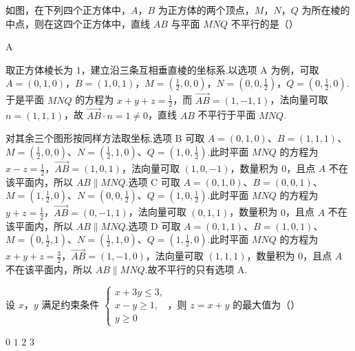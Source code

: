 \begin{problem}
如图，在下列四个正方体中，\(A\)，\(B\) 为正方体的两个顶点，\(M\)，\(N\)，\(Q\) 为所在棱的中点，则在这四个正方体中，直线 \(AB\) 与平面 \(MNQ\) 不平行的是（\quad）

    {}
    {}
    {}
\end{problem}

\begin{answer}
A
\end{answer}

\begin{solution}
取正方体棱长为 \(1\)，建立沿三条互相垂直棱的坐标系.以选项 A 为例，可取 \(A=(0,1,0)\)，\(B=(1,0,1)\)，\(M=(\frac12,0,0)\)，\(N=(0,0,\frac12)\)，\(Q=(0,\frac12,0)\).于是平面 \(MNQ\) 的方程为 \(x+y+z=\frac12\)，而 \(\overrightarrow{AB}=(1,-1,1)\)，法向量可取 \(n=(1,1,1)\)，故 \(\overrightarrow{AB}\cdot n=1\ne0\)，直线 \(AB\) 不平行于平面 \(MNQ\).

对其余三个图形按同样方法取坐标.选项 B 可取 \(A=(0,1,0)\)、\(B=(1,1,1)\)、\(M=(\frac12,0,0)\)、\(N=(\frac12,1,0)\)、\(Q=(1,0,\frac12)\).此时平面 \(MNQ\) 的方程为 \(x-z=\frac12\)，\(\overrightarrow{AB}=(1,0,1)\)，法向量可取 \((1,0,-1)\)，数量积为 \(0\)，且点 \(A\) 不在该平面内，所以 \(AB\parallel MNQ\).选项 C 可取 \(A=(0,1,0)\)、\(B=(0,0,1)\)、\(M=(1,\frac12,0)\)、\(N=(0,0,\frac12)\)、\(Q=(1,0,\frac12)\).此时平面 \(MNQ\) 的方程为 \(y+z=\frac12\)，\(\overrightarrow{AB}=(0,-1,1)\)，法向量可取 \((0,1,1)\)，数量积为 \(0\)，且点 \(A\) 不在该平面内，所以 \(AB\parallel MNQ\).选项 D 可取 \(A=(0,1,1)\)、\(B=(1,0,1)\)、\(M=(0,\frac12,1)\)、\(N=(\frac12,1,0)\)、\(Q=(1,\frac12,0)\).此时平面 \(MNQ\) 的方程为 \(x+y+z=\frac32\)，\(\overrightarrow{AB}=(1,-1,0)\)，法向量可取 \((1,1,1)\)，数量积为 \(0\)，且点 \(A\) 不在该平面内，所以 \(AB\parallel MNQ\).故不平行的只有选项 A.
\end{solution}

\begin{problem}
设 \(x\)，\(y\) 满足约束条件 \(\begin{cases}
x+3y\le 3,\\
x-y\ge 1,\\
y\ge 0
\end{cases}\)，则 \(z=x+y\) 的最大值为（\quad）

\choices
    {\(0\)}
    {\(1\)}
    {\(2\)}
    {\(3\)}
\end{problem}

